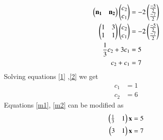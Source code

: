 \documentclass[journal,12pt,twocolumn]{IEEEtran}
\begin{document}
\begin{align}
    \begin{pmatrix}\mathbf{n_1} & \mathbf{n_2}\end{pmatrix}\begin{pmatrix}c_2\\c_1\end{pmatrix}&=-2\begin{pmatrix}\frac{-5}{2}\\\frac{-7}{2}\end{pmatrix}\\
    \begin{pmatrix}1& 3\\1 & 1\end{pmatrix}\begin{pmatrix}c_2\\c_1\end{pmatrix}&=-2\begin{pmatrix}\frac{-5}{2}\\\frac{-7}{2}\end{pmatrix}\\
    \frac{1}{3}c_2+3c_1&=5\label{1}\\
    c_2+c_1&=7\label{2}
\end{align}
Solving equations \eqref{1} ,\eqref{2} we get 
\begin{align}
    c_1&=1\\
    c_2&=6
\end{align}
Equations \eqref{m1}, \eqref{m2} can be modified as
\begin{align}
    \begin{pmatrix}\frac{1}{3}& 1\end{pmatrix}\mathbf{x}&=5\\
    \begin{pmatrix}3 & 1\end{pmatrix}\mathbf{x}&=7
\end{align}
\end{document}
